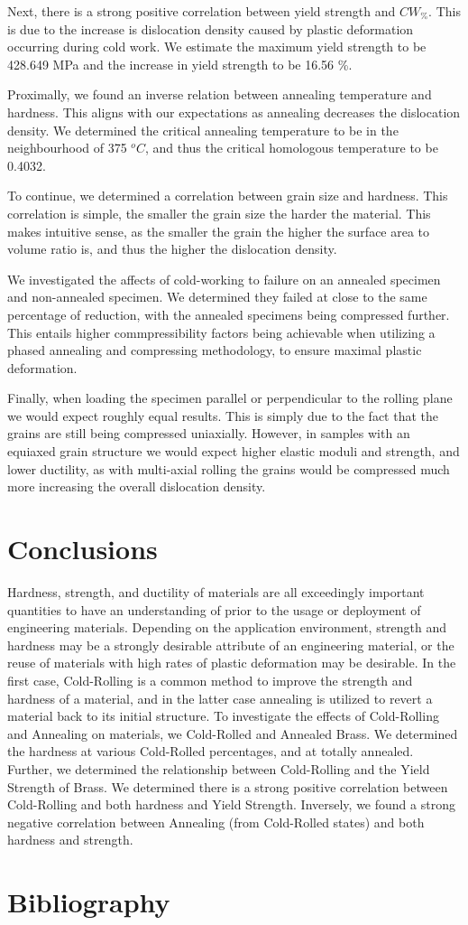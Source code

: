 \documentclass{article}
\begin{document}
Next, there is a strong positive correlation between yield strength and $CW_{\%}$. This is due to the increase is dislocation density caused by plastic deformation occurring during cold work. We estimate the maximum yield strength to be 428.649 MPa and the increase in yield strength to be 16.56 \%.

Proximally, we found an inverse relation between annealing temperature and hardness. This aligns with our expectations as annealing decreases the dislocation density. We determined the critical annealing temperature to be in the neighbourhood of 375 $^oC$, and thus the critical homologous temperature to be 0.4032. 

To continue, we determined a correlation between grain size and hardness. This correlation is simple, the smaller the grain size the harder the material. This makes intuitive sense, as the smaller the grain the higher the surface area to volume ratio is, and thus the higher the dislocation density. 

We investigated the affects of cold-working to failure on an annealed specimen and non-annealed specimen. We determined they failed at close to the same percentage of reduction, with the annealed specimens being compressed further. This entails higher commpressibility factors being achievable when utilizing a phased annealing and compressing methodology, to ensure maximal plastic deformation. 

Finally, when loading the specimen parallel or perpendicular to the rolling plane we would expect roughly equal results. This is simply due to the fact that the grains are still being compressed uniaxially. However, in samples with an equiaxed grain structure we would expect higher elastic moduli and strength, and lower ductility, as with multi-axial rolling the grains would be compressed much more increasing the overall dislocation density. 

\section{Conclusions}
Hardness, strength, and ductility of materials are all exceedingly important quantities to have an understanding of prior to the usage or deployment of engineering materials. Depending on the application environment, strength and hardness may be a strongly desirable attribute of an engineering material, or the reuse of materials with high rates of plastic deformation may be desirable. In the first case, Cold-Rolling is a common method to improve the strength and hardness of a material, and in the latter case annealing is utilized to revert a material back to its initial structure. To investigate the effects of Cold-Rolling and Annealing on materials, we Cold-Rolled and Annealed Brass. We determined the hardness at various Cold-Rolled percentages, and at totally annealed. Further, we determined the relationship between Cold-Rolling and the Yield Strength of Brass. We determined there is a strong positive correlation between Cold-Rolling and both hardness and Yield Strength. Inversely, we found a strong negative correlation between Annealing (from Cold-Rolled states) and both hardness and strength.
\section{Bibliography}
\printbibliography[heading=none]
\end{document}
